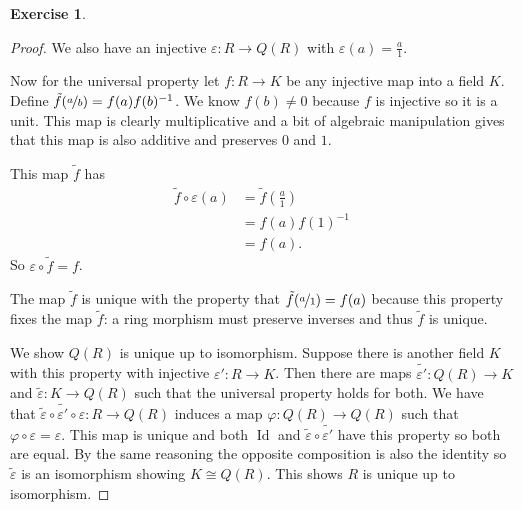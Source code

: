 \documentclass{article}
\DeclareMathOperator{\Id}{Id}
\theoremstyle{definition}
\newtheorem{question}{Exercise}
\begin{document}
\begin{question}
\begin{enumerate}[(a)]
\begin{proof}
                  We also have an injective \(\varepsilon:R\to Q(R)\) with
                  \(\varepsilon(a)=\frac{a}{1}\).

                  Now for the universal property let \(f:R\to K\) be any
                  injective map into a field \(K\). Define
                  \(\tilde{f}(\nicefrac{a}{b})=f(a)f(b)^{-1}\). We know
                  \(f(b)\neq 0\) because \(f\) is injective so it is a unit.
                  This map is clearly multiplicative and a bit of algebraic
                  manipulation gives that this map is also additive and
                  preserves \(0\) and \(1\).

                  This map \(\tilde{f}\) has
                  \begin{align*}
                      \tilde{f}\circ\varepsilon(a) & =\tilde{f}\left(\frac{a}{1}\right) \\
                                                   & =f(a)f(1)^{-1}                     \\
                                                   & =f(a).
                  \end{align*}
                  So \(\varepsilon\circ\tilde{f}=f\).

                  The map \(\tilde{f}\) is unique with the property that
                  \(\tilde{f}(\nicefrac{a}{1})=f(a)\) because this property
                  fixes the map \(\tilde{f}\): a ring morphism must preserve
                  inverses and thus \(\tilde{f}\) is unique.

                  We show \(Q(R)\) is unique up to isomorphism. Suppose there is
                  another field \(K\) with this property with injective
                  \(\varepsilon':R\to K\). Then there are maps
                  \(\tilde{\varepsilon'}:Q(R)\to K\) and
                  \(\tilde{\varepsilon}:K\to Q(R)\) such that the universal
                  property holds for both. We have that
                  \(\tilde{\varepsilon}\circ\tilde{\varepsilon'}\circ\varepsilon:R\to
                  Q(R)\) induces a map \(\varphi:Q(R)\to Q(R)\) such that
                  \(\varphi\circ\varepsilon=\varepsilon\). This map is unique
                  and both \(\Id\) and
                  \(\tilde{\varepsilon}\circ\tilde{\varepsilon'}\) have this
                  property so both are equal. By the same reasoning the opposite
                  composition is also the identity so \(\tilde{\varepsilon}\) is
                  an isomorphism showing \(K\cong Q(R)\). This shows \(R\) is
                  unique up to isomorphism.
              \end{proof}


\end{enumerate}
\end{question}
\end{document}
